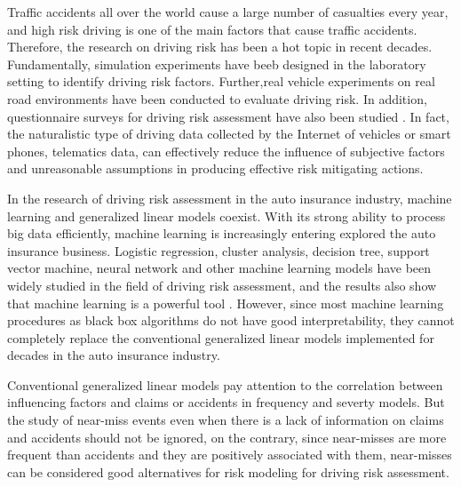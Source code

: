 \documentclass[num-refs]{wiley-article}
\begin{document}
Traffic accidents all over the world cause a large number of casualties every year, and high risk driving is one of the main factors that cause traffic accidents\cite{litman2007distance}. Therefore, the research on driving risk has been a hot topic in recent decades. Fundamentally, simulation experiments have beeb designed in the laboratory setting to identify driving risk factors\cite{de2013analysis,siordia2014subjective,charlton2014s,peng2018intelligent}. Further,real vehicle experiments on real road environments have been conducted to evaluate driving risk\cite{wang2015driving,yan2016hazardous,liao2018cross,jiang2019real,yan2019driving}. In addition, questionnaire surveys for driving risk assessment have also been studied \cite{lu2013focusing,wang2020driving}. In fact, the naturalistic type of driving data collected by the Internet of vehicles or smart phones, telematics data, can effectively reduce the influence of subjective factors and unreasonable assumptions in producing effective risk mitigating actions\cite{handel2014insurance,joubert2016combining,verbelen2018unravelling,ma2018use,jiang2020drivers}.

In the research of driving risk assessment in the auto insurance industry, machine learning and generalized linear models coexist. With its strong ability to process big data efficiently, machine learning is increasingly entering explored the auto insurance business. Logistic regression\cite{jin2018latent}, cluster analysis\cite{carfora2019pay}, decision tree\cite{paefgen2013evaluation}, support vector machine\cite{burton2016driver}, neural network\cite{baecke2017value} and other machine learning models\cite{guelman2012gradient,bian2018good,jafarnejad2017towards} have been widely studied in the field of driving risk assessment, and the results also show that machine learning is a powerful tool \cite{paefgen2014multivariate}. However, since most machine learning procedures as black box algorithms do not have good interpretability, they cannot completely replace the conventional generalized linear models implemented for decades in the auto insurance industry\cite{pesantez2019predicting}. 

Conventional generalized linear models pay attention to the correlation between influencing factors and claims or accidents in frequency and severty models\cite{boucher2013pay,verbelen2018unravelling,ma2018use,guillen2019use}. But the study of near-miss events even when there is a lack of information on claims and accidents should not be ignored\cite{wang2015driving,guillen2020can}, on the contrary, since near-misses are more frequent than accidents and they are positively associated with them, near-misses can be considered good alternatives for risk modeling for driving risk assessment. 
\end{document}
